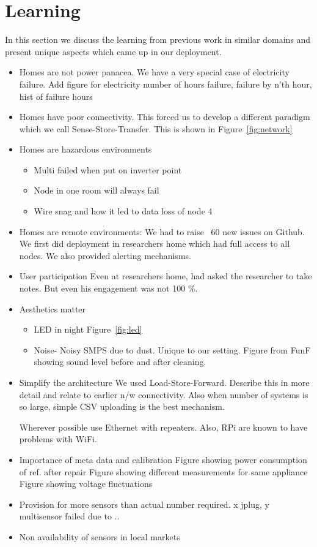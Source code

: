 \documentclass[10pt]{sensys-proc}
\newcommand{\figref}[1]{Figure~\ref{#1}}
\begin{document}
\section{Learning}
In this section we discuss the learning from previous work in similar domains and present unique aspects which came up in our deployment.
\begin{itemize}

\item Homes are not power panacea. We have a very special case of electricity failure. Add figure
for electricity number of hours failure, failure by n'th hour, hist of failure hours
\item Homes have poor connectivity. This forced us to develop a different paradigm which we call Sense-Store-Transfer. This is shown in \figref{fig:network}

\item Homes are hazardous environments
\begin{itemize}
\item Multi failed when put on inverter point
\item Node in one room will always fail
\item Wire snag and how it led to data loss of node 4
\end{itemize}

\item Homes are remote environments:
We had to raise ~60 new issues on Github. We first did deployment in researchers home which had full access to all nodes.
We also provided alerting mechanisms.

\item User participation
Even at researchers home, had asked the researcher to take notes. But even his engagement was not 100 \%.

\item Aesthetics matter
\begin{itemize}
\item LED in night \figref{fig:led}
\item Noise- Noisy SMPS due to dust. Unique to our setting. Figure from FunF showing sound level before and after cleaning.
\end{itemize}

\item Simplify the architecture
We used Load-Store-Forward. Describe this in more detail and relate to earlier n/w connectivity.
Also when number of systems is so large, simple CSV uploading is the best mechanism.

Wherever possible use Ethernet with repeaters. Also, RPi are known to have problems with WiFi.

\item Importance of meta data and calibration
Figure showing power consumption of ref. after repair
Figure showing different measurements for same appliance
Figure showing voltage fluctuations

\item Provision for more sensors than actual number required. x jplug, y multisensor failed due to ..
\item Non availability of sensors in local markets

\end{itemize}
\end{document}
